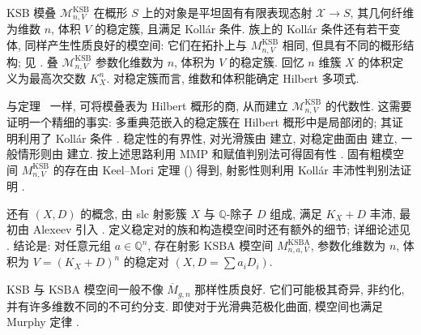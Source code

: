 KSB 模叠 $\mathcal M_{n,V}^{\mathrm{KSB}}$ 在概形 $S$ 上的对象是平坦固有有限表现态射 $\mathcal X\to S$, 其几何纤维为维数 $n$, 体积 $V$ 的稳定簇, 且满足 Koll\'ar 条件. 族上的 Koll\'ar 条件还有若干变体, 同样产生性质良好的模空间: 它们在拓扑上与 $M_{n,V}^{\mathrm{KSB}}$ 相同, 但具有不同的概形结构; 见 \cite[\S6]{Kol23}. 叠 $\mathcal M_{n,V}^{\mathrm{KSB}}$ 参数化维数为 $n$, 体积为 $V$ 的稳定簇. 回忆 $n$ 维簇 $X$ 的体积定义为最高次交数 $K_X^n$. 对稳定簇而言, 维数和体积能确定 Hilbert 多项式.

与定理~ 一样, 可将模叠表为 Hilbert 概形的商, 从而建立 $\mathcal M_{n,V}^{\mathrm{KSB}}$ 的代数性. 这需要证明一个精细的事实: 多重典范嵌入的稳定簇在 Hilbert 概形中是局部闭的; 其证明利用了 Koll\'ar 条件 \cite[推论 24]{Kol09}. 稳定性的有界性, 对光滑簇由 \cite{Mat72} 建立, 对稳定曲面由 \cite{Ale93} 建立, 一般情形则由 \cite{HMX18} 建立. 按上述思路利用 MMP 和赋值判别法可得固有性 \cite[定理 2.51]{Kol23}. 固有粗模空间 $M_{n,V}^{\mathrm{KSB}}$ 的存在由 Keel--Mori 定理 () 得到, 射影性则利用 Koll\'ar 丰沛性判别法证明 \cite{KP17}.

还有 $(X,D)$ 的概念, 由 slc 射影簇 $X$ 与 $\mathbb Q$-除子 $D$ 组成, 满足 $K_X+D$ 丰沛, 最初由 Alexeev 引入 \cite{Ale93}. 定义稳定对的族和构造模空间时还有额外的细节; 详细论述见 \cite{Kol23}. 结论是: 对任意元组 $a\in\mathbb Q^n$, 存在射影 KSBA 模空间 $M_{n,a,V}^{\mathrm{KSBA}}$, 参数化维数为 $n$, 体积为 $V=(K_X+D)^n$ 的稳定对 $(X,D=\sum a_iD_i)$.

KSB 与 KSBA 模空间一般不像 $\overline M_{g,n}$ 那样性质良好. 它们可能极其奇异, 非约化, 并有许多维数不同的不可约分支. 即使对于光滑典范极化曲面, 模空间也满足 Murphy 定律 \cite{Vak06}.
